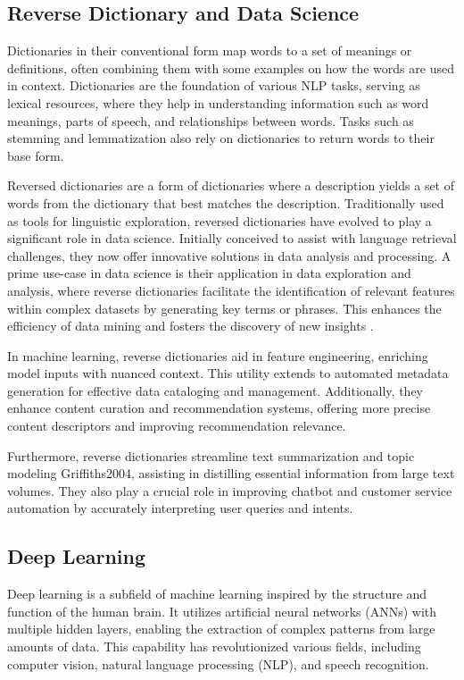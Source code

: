 \documentclass[15pt]{article}
\begin{document}
\subsection{Reverse Dictionary and Data Science}

Dictionaries in their conventional form map words to a set of meanings or definitions, often combining them with some examples on how the words are used in context. Dictionaries are the foundation of various NLP tasks, serving as lexical resources, where they help in understanding information such as word meanings, parts of speech, and relationships between words. Tasks such as stemming and lemmatization also rely on dictionaries to return words to their base form.

Reversed dictionaries are a form of dictionaries where a description yields a set of words from the dictionary that best matches the description. Traditionally used as tools for linguistic exploration, reversed dictionaries have evolved to play a significant role in data science. Initially conceived to assist with language retrieval challenges, they now offer innovative solutions in data analysis and processing. A prime use-case in data science is their application in data exploration and analysis, where reverse dictionaries facilitate the identification of relevant features within complex datasets by generating key terms or phrases. This enhances the efficiency of data mining and fosters the discovery of new insights \cite{Chen2022}.

In machine learning, reverse dictionaries aid in feature engineering, enriching model inputs with nuanced context. This utility extends to automated metadata generation for effective data cataloging and management. Additionally, they enhance content curation and recommendation systems, offering more precise content descriptors and improving recommendation relevance.

Furthermore, reverse dictionaries streamline text summarization and topic modeling Griffiths2004, assisting in distilling essential information from large text volumes. They also play a crucial role in improving chatbot and customer service automation by accurately interpreting user queries and intents.

\subsection{Deep Learning}

Deep learning is a subfield of machine learning inspired by the structure and function of the human brain. It utilizes artificial neural networks (ANNs) with multiple hidden layers, enabling the extraction of complex patterns from large amounts of data. This capability has revolutionized various fields, including computer vision, natural language processing (NLP), and speech recognition.
\end{document}
